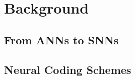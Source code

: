 \section{Background}
\label{sec:background}


\subsection{From ANNs to SNNs}

\subsection{Neural Coding Schemes}
